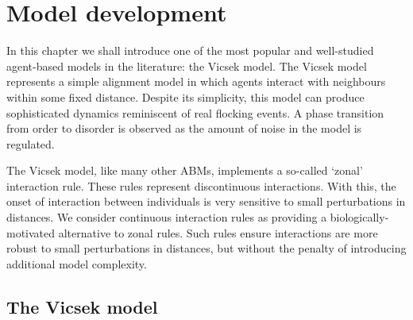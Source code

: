 \graphicspath{{fig/model_development/}}

\chapter{Model development}
\label{cha:model_dev}

In this chapter we shall introduce one of the most popular and well-studied
agent-based models in the literature: the Vicsek model. The Vicsek model
represents a simple alignment model in which agents interact with neighbours
within some fixed distance. Despite its simplicity, this model can produce
sophisticated dynamics reminiscent of real flocking events. A phase transition
from order to disorder is observed as the amount of noise in the model is
regulated.

The Vicsek model, like many other ABMs, implements a so-called `zonal'
interaction rule. These rules represent discontinuous interactions. With this,
the onset of interaction between individuals is very sensitive to small
perturbations in distances. We consider continuous interaction rules as
providing a biologically-motivated alternative to zonal rules. Such rules
ensure interactions are more robust to small perturbations in distances, but
without the penalty of introducing additional model complexity.

\section{The Vicsek model}

